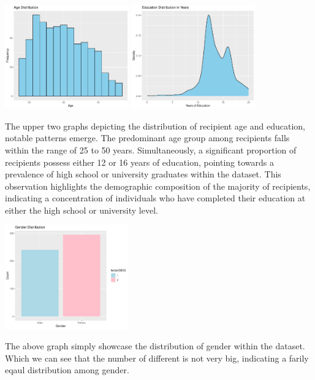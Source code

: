 \documentclass{article}[13pt]
\begin{document}
\includegraphics[width=0.4\textwidth]{1_age_distribution.pdf}
\includegraphics[width=0.4\textwidth]{2_education_distribution.pdf}

The upper two graphs depicting the distribution of recipient age and education, 
notable patterns emerge. The predominant age group among recipients falls within the range 
of 25 to 50 years. Simultaneously, a significant proportion of recipients possess either 
12 or 16 years of education, pointing towards a prevalence of high school or university graduates 
within the dataset. This observation highlights the demographic composition of the majority of recipients, 
indicating a concentration of individuals who have completed their education at either the high school or university level.
\newline

\includegraphics[width=0.4\textwidth]{3_gender_distribution.pdf}

The above graph simply showcase the distribution of gender within the dataset. Which we can 
see that the number of different is not very big, indicating a farily eqaul distribution among gender.
\newline
\end{document}
